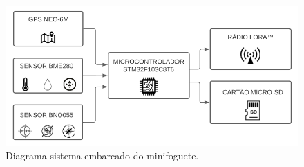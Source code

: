 


\begin{figure}[ht]
    \centering
    \caption{Diagrama sistema embarcado do minifoguete.}
    \begin{center}
        \includegraphics[width=1.0\textwidth]{img/Fluxograma_Sistema1.png}
    \end{center}
    \vspace{-0.5cm}
    \label{fig:Fluxograma_Sistema1}
\end{figure}